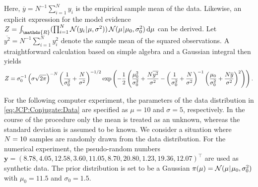 Here, \(\overline{y} = N^{-1} \sum_{i=1}^N y_i\) is the empirical sample mean of the data.
Likewise, an explicit expression for the model evidence
\(\scale = \int_{\mathds{R}} (\prod_{i=1}^\dimData \mathcal{N}(y_i \cond \mu, \sigma^2)) \, \mathcal{N}(\mu \cond \mu_0,\sigma_0^2) \, \mathrm{d} \mu\) can be derived.
Let \(\overline{y^2} = N^{-1} \sum_{i=1}^N y_i^2\) denote the sample mean of the squared observations.
A straightforward calculation based on simple algebra and a Gaussian integral then yields
\begin{equation} \label{eq:JCP:Conjugate:ModelEvidence}
  Z = \sigma_0^{-1} \left( \sigma \sqrt{2 \pi} \right)^{-N} \left( \frac{1}{\sigma_0^2} + \frac{N}{\sigma^2} \right)^{-1/2}
  \exp \left( - \frac{1}{2} \left( \frac{\mu_0^2}{\sigma_0^2} + \frac{N \overline{y^2}}{\sigma^2}
  - \left( \frac{1}{\sigma_0^2} + \frac{N}{\sigma^2} \right)^{-1} \left( \frac{\mu_0}{\sigma_0^2} + \frac{N \overline{y}}{\sigma^2} \right)^2 \right) \right).
\end{equation}
\par %
For the following computer experiment, the parameters of the data distribution in \cref{eq:JCP:Conjugate:Data} are specified as \(\mu = 10\) and \(\sigma = 5\), respectively.
In the course of the procedure only the mean is treated as an unknown, whereas the standard deviation is assumed to be known.
We consider a situation where \(N = 10\) samples are randomly drawn from the data distribution.
For the numerical experiment, the pseudo-random numbers \(\bm{y} = (8.78,4.05,12.58,3.60,11.05,8.70,20.80,1.23,19.36,12.07)^\top\) are used as synthetic data.
The prior distribution is set to be a Gaussian \(\pi(\mu) = \mathcal{N}(\mu {\:\!}|{\:\!} \mu_0,\sigma_0^2)\) with \(\mu_0 = 11.5\) and \(\sigma_0 = 1.5\).

